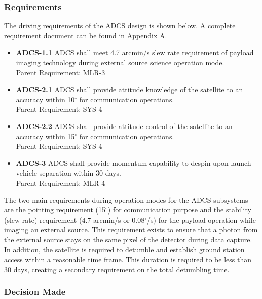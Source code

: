 \documentclass[12pt]{article}
\begin{document}
			\subsubsection{Requirements}
			The driving requirements of the ADCS design is shown below. A complete requirement document can be found in Appendix A. 
					\begin{itemize}
					\item \textbf{ADCS-1.1} ADCS shall meet 4.7 arcmin/s slew rate requirement of payload imaging technology during external source science operation mode.\\
					Parent Requirement: MLR-3

					\item \textbf{ADCS-2.1} ADCS shall provide attitude knowledge of the satellite to an accuracy within 10$^\circ$  for communication operations.\\
					Parent Requirement: SYS-4
					\item \textbf{ADCS-2.2} ADCS shall provide attitude control of the satellite to an accuracy within 15$^\circ$  for communication operations.\\
					Parent Requirement: SYS-4
					\item \textbf{ADCS-3} ADCS shall provide momentum capability to despin upon launch vehicle separation within 30 days.\\
					Parent Requirement: MLR-4
					\end{itemize}
				The two main requirements during operation modes for the ADCS subsystems are the pointing requirement (15$^\circ$) for communication purpose and the stability (slew rate) requirement (4.7 arcmin/s or 0.08$^\circ$/s) for the payload operation while imaging an external source. This requirement exists to ensure that a photon from the external source stays on the same pixel of the detector during data capture. In addition, the satellite is required to detumble and establish ground station access within a reasonable time frame. This duration is required to be less than 30 days, creating a secondary requirement on the total detumbling time. 
					\subsubsection{Decision Made}
\end{document}
